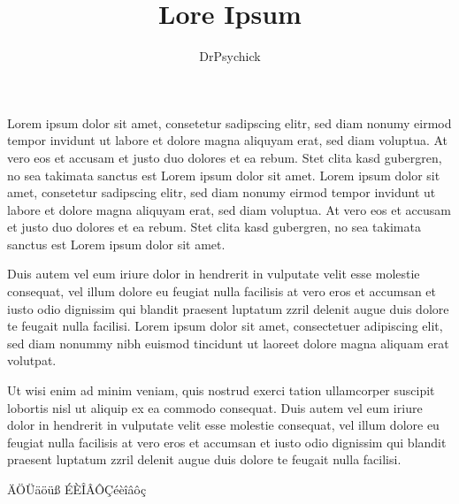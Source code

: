 \documentclass[2headlines,a4paper,10pt]{scrreprt}
\title{Lore Ipsum}
\author{DrPsychick}
\begin{document}
Lorem ipsum dolor sit amet, consetetur sadipscing elitr, sed diam nonumy eirmod tempor invidunt ut labore et dolore
magna aliquyam erat, sed diam voluptua. At vero eos et accusam et justo duo dolores et ea rebum. Stet clita kasd
gubergren, no sea takimata sanctus est Lorem ipsum dolor sit amet. Lorem ipsum dolor sit amet, consetetur sadipscing
elitr, sed diam nonumy eirmod tempor invidunt ut labore et dolore magna aliquyam erat, sed diam voluptua. At vero eos
et accusam et justo duo dolores et ea rebum. Stet clita kasd gubergren, no sea takimata sanctus est Lorem ipsum dolor
sit amet.

Duis autem vel eum iriure dolor in hendrerit in vulputate velit esse molestie consequat, vel illum dolore eu feugiat
nulla facilisis at vero eros et accumsan et iusto odio dignissim qui blandit praesent luptatum zzril delenit augue duis
dolore te feugait nulla facilisi. Lorem ipsum dolor sit amet, consectetuer adipiscing elit, sed diam nonummy nibh
euismod tincidunt ut laoreet dolore magna aliquam erat volutpat.

Ut wisi enim ad minim veniam, quis nostrud exerci tation ullamcorper suscipit lobortis nisl ut aliquip ex ea commodo
consequat. Duis autem vel eum iriure dolor in hendrerit in vulputate velit esse molestie consequat, vel illum dolore eu
feugiat nulla facilisis at vero eros et accumsan et iusto odio dignissim qui blandit praesent luptatum zzril delenit
augue duis dolore te feugait nulla facilisi.

ÄÖÜäöüß
ÉÈÎÂÔÇéèîâôç
\end{document}
